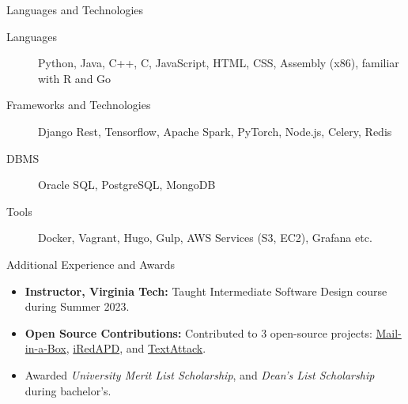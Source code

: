\documentclass[]{mcdowellcv}
\begin{document}
	\newpage
	\begin{cvsection}{Languages and Technologies}
		\begin{cvsubsection}{}{}{}
			\begin{description}
				\item[Languages] Python, Java, C++, C, JavaScript, HTML, CSS, Assembly (x86), familiar with R and Go
				\item[Frameworks and Technologies] Django Rest, Tensorflow, Apache Spark, PyTorch, Node.js, Celery, Redis
				\item[DBMS] Oracle SQL, PostgreSQL, MongoDB
				\item[Tools] Docker, Vagrant, Hugo, Gulp, AWS Services (S3, EC2), Grafana etc. %
			\end{description}
		\end{cvsubsection}
	\end{cvsection}

	\begin{cvsection}{Additional Experience and Awards}
		\begin{cvsubsection}{}{}{}
			\begin{itemize}
				\item \textbf{Instructor, Virginia Tech:} Taught Intermediate Software Design course during Summer 2023.
    			\item \textbf{Open Source Contributions:} Contributed to 3 open-source projects: \href{https://github.com/mail-in-a-box/mailinabox}{Mail-in-a-Box}, \href{https://github.com/iredmail/iRedAPD}{iRedAPD}, and \href{https://github.com/QData/TextAttack}{TextAttack}.
				\item Awarded \emph{University Merit List Scholarship}, and \emph{Dean's List Scholarship} during bachelor's.
			\end{itemize}
		\end{cvsubsection}
	\end{cvsection}
\end{document}
